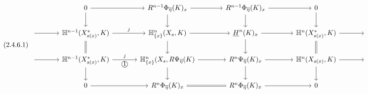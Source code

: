 \begin{equation}\tag{2.4.6.1}
\begin{tikzcd}[column sep=large]
{} & 0 \arrow[r] \arrow[d] & R^{n-1}\Phi_{\overline{\eta}}(K)_x \arrow[r] \arrow[d] & R^{n-1}\Phi_{\overline{\eta}}(K)_x \arrow[r] \arrow[d] & 0 \arrow[d] & {} \\
{} \arrow[r] & \mathbb{H}^{n-1}(X^{*}_{s(x)},K) \arrow[r, "j"] \arrow[d, equal] & \mathbb{H}^{n}_{\{x\}}(X_s, K) \arrow[r] \arrow[d] & \underline{H}^{n}(K)_x \arrow[r] \arrow[d] & \mathbb{H}^{n}(X^{*}_{s(x)}, K) \arrow[r] \arrow[d, equal] & {} \\
{} \arrow[r] & \mathbb{H}^{n-1}(X^{*}_{s(x)}, K) \arrow[r, "j", "\mbox{\textcircled{1}}"'] \arrow[d] & \mathbb{H}^{n}_{\{x\}}(X_s, R\Psi_{\overline{\eta}}(K) \arrow[r] \arrow[d] & R^{n}\Psi_{\overline{\eta}}(K)_x \arrow[r] \arrow[d] & \mathbb{H}^{n}(X_{s(x)},K) \arrow[r] \arrow[d] & {} \\
{} & 0 \arrow[r] & R^{n}\Phi_{\overline{\eta}}(K)_x \arrow[r, equal] & R^{n}\Phi_{\overline{\eta}}(K)_x \arrow[r] & 0 &
{} \end{tikzcd}
\end{equation}
